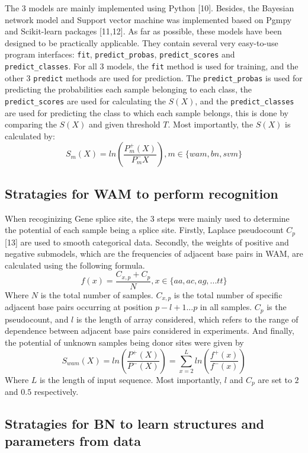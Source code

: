 \documentclass[11pt]{article}
\begin{document}
The 3 models are mainly implemented using Python {[}10{]}. Besides, the
Bayesian network model and Support vector machine was implemented based
on Pgmpy and Scikit-learn packages {[}11,12{]}. As far as possible,
these models have been designed to be practically applicable. They
contain several very easy-to-use program interfaces: \texttt{fit},
\texttt{predict\_probas}, \texttt{predict\_scores} and
\texttt{predict\_classes}. For all 3 models, the \texttt{fit} method is
used for training, and the other 3 \texttt{predict} methods are used for
prediction. The \texttt{predict\_probas} is used for predicting the
probabilities each sample belonging to each class, the
\texttt{predict\_scores} are used for calculating the \(S(X)\), and the
\texttt{predict\_classes} are used for predicting the class to which
each sample belongs, this is done by comparing the \(S(X)\) and given
threshold \(T\). Most importantly, the \(S(X)\) is calculated by:
\[S_m(X) = ln(\frac{P_m^+ (X)}{P_m^- {X}}), m\in\{wam, bn, svm\} \tag{1}\]

    \hypertarget{stratagies-for-wam-to-perform-recognition}{%
\subsection{Stratagies for WAM to perform
recognition}\label{stratagies-for-wam-to-perform-recognition}}

When recoginizing Gene splice site, the 3 steps were mainly used to
determine the potential of each sample being a splice site. Firstly,
Laplace pseudocount \(C_p\) {[}13{]} are used to smooth categorical
data. Secondly, the weights of positive and negative submodels, which
are the frequencies of adjacent base pairs in WAM, are calculated using
the following formula.
\[f(x) = \frac{C_{x,p}+C_p}{N},x \in \{aa,ac,ag,...tt\} \tag{2} \] Where
\(N\) is the total number of samples. \(C_{x,p}\) is the total number of
specific adjacent base pairs occurring at position \(p-l+1...p\) in all
samples. \(C_p\) is the pseudocount, and \(l\) is the length of array
considered, which refers to the range of dependence between adjacent
base pairs considered in experiments. And finally, the potential of
unknown samples being donor sites were given by
\[S_{wam}(X) = ln(\frac{P^+(X)}{P^-(X)}) = \sum_{x=2}^{L}{ln(\frac{f^+(x)}{f^-(x)})} \tag{3}\]
Where \(L\) is the length of input sequence. Most importantly, \(l\) and
\(C_p\) are set to \(2\) and \(0.5\) respectively.

    \hypertarget{stratagies-for-bn-to-learn-structures-and-parameters-from-data}{%
\subsection{Stratagies for BN to learn structures and parameters from
data}\label{stratagies-for-bn-to-learn-structures-and-parameters-from-data}}
\end{document}
